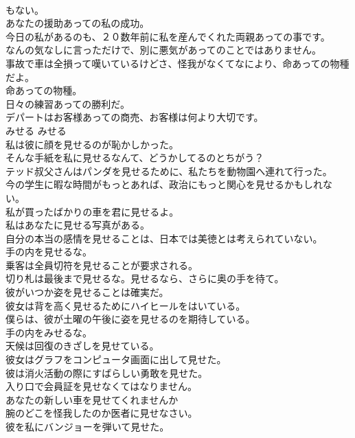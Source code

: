 \documentclass[8pt]{extreport}
\begin{document}
\begin{CJK}{UTF8}{min}
\\	もない。	
\\	あなたの援助あっての私の成功。  
\\	今日の私があるのも、２０数年前に私を産んでくれた両親あっての事です。  
\\	なんの気なしに言っただけで、別に悪気があってのことではありません。   
\\	事故で車は全損って嘆いているけどさ、怪我がなくてなにより、命あっての物種だよ。   
\\	命あっての物種。   
\\	日々の練習あっての勝利だ。  
\\	デパートはお客様あっての商売、お客様は何より大切です。  
\\	みせる	みせる	
\\	私は彼に顔を見せるのが恥かしかった。  
\\	そんな手紙を私に見せるなんて、どうかしてるのとちがう？  
\\	テッド叔父さんはパンダを見せるために、私たちを動物園へ連れて行った。  
\\	今の学生に暇な時間がもっとあれば、政治にもっと関心を見せるかもしれない。  
\\	私が買ったばかりの車を君に見せるよ。  
\\	私はあなたに見せる写真がある。  
\\	自分の本当の感情を見せることは、日本では美徳とは考えられていない。  
\\	手の内を見せるな。  
\\	乗客は全員切符を見せることが要求される。  
\\	切り札は最後まで見せるな。見せるなら、さらに奥の手を待て。  
\\	彼がいつか姿を見せることは確実だ。  
\\	彼女は背を高く見せるためにハイヒールをはいている。  
\\	僕らは、彼が土曜の午後に姿を見せるのを期待している。  
\\	手の内をみせるな。  
\\	天候は回復のきざしを見せている。   
\\	彼女はグラフをコンピュータ画面に出して見せた。   
\\	彼は消火活動の際にすばらしい勇敢を見せた。   
\\	入り口で会員証を見せなくてはなりません。   
\\	あなたの新しい車を見せてくれませんか   
\\	腕のどこを怪我したのか医者に見せなさい。   
\\	彼を私にバンジョーを弾いて見せた。   

\end{CJK}
\end{document}
